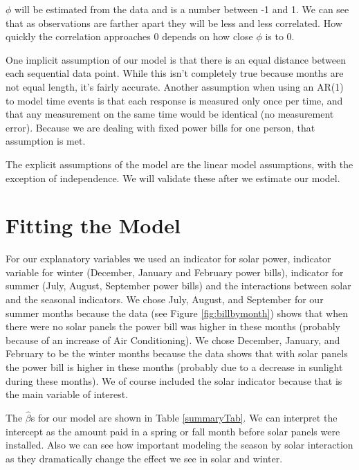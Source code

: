 \documentclass{svproc}
\begin{document}
$\phi$ will be estimated from the data and is a number between -1 and 1. We can see that as observations are farther apart they will be less and less correlated. How quickly the correlation approaches 0 depends on how close $\phi$ is to 0. 

One implicit assumption of our model is that there is an equal distance between each sequential data point. While this isn't completely true because months are not equal length, it's fairly accurate. Another assumption when using an AR(1) to model time events is that each response is measured only once per time, and that any measurement on the same time would be identical (no measurement error). Because we are dealing with fixed power bills for one person, that assumption is met.

The explicit assumptions of the model are the linear model assumptions, with the exception of independence. We will validate these after we estimate our model. 

\section{Fitting the Model}



For our explanatory variables we used an indicator for solar power, indicator variable for winter (December, January and February power bills), indicator for summer (July, August, September power bills) and the interactions between solar and the seasonal indicators. We chose July, August, and September for our summer months because the data (see Figure \ref{fig:billbymonth}) shows that when there were no solar panels the power bill was higher in these months (probably because of an increase of Air Conditioning). We chose December, January, and February to be the winter months because the data shows that with solar panels the power bill is higher in these months (probably due to a decrease in sunlight during these months). We of course included the solar indicator because that is the main variable of interest.

The $\hat{\beta}$s for our model are shown in Table \ref{summaryTab}. We can interpret the intercept as the amount paid in a spring or fall month before solar panels were installed. Also we can see how important modeling the season by solar interaction as they dramatically change the effect we see in solar and winter.
\end{document}
